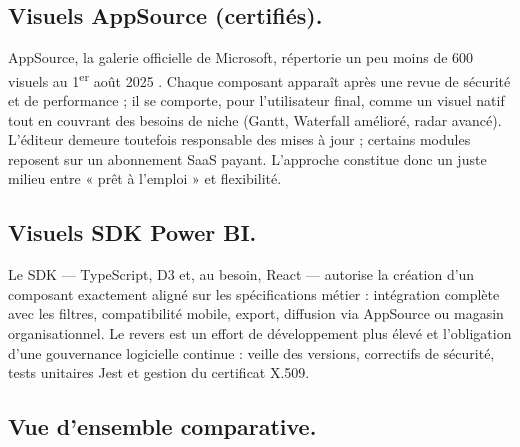\subsection{Visuels AppSource (certifiés).}  
AppSource, la galerie officielle de Microsoft, répertorie un peu moins de 600 visuels au 1\textsuperscript{er} août 2025 \parencite{AppSourceCount2025}. Chaque composant apparaît après une revue de sécurité et de performance ; il se comporte, pour l’utilisateur final, comme un visuel natif tout en couvrant des besoins de niche (Gantt, Waterfall amélioré, radar avancé). L’éditeur demeure toutefois responsable des mises à jour ; certains modules reposent sur un abonnement SaaS payant. L’approche constitue donc un juste milieu entre « prêt à l’emploi » et flexibilité.


\subsection{Visuels SDK Power BI.}  
Le SDK — TypeScript, D3 et, au besoin, React — autorise la création d’un composant exactement aligné sur les spécifications métier : intégration complète avec les filtres, compatibilité mobile, export, diffusion via AppSource ou magasin organisationnel. Le revers est un effort de développement plus élevé et l’obligation d’une gouvernance logicielle continue : veille des versions, correctifs de sécurité, tests unitaires Jest et gestion du certificat X.509.

\subsection{Vue d’ensemble comparative.}

